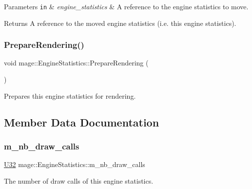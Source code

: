 \begin{DoxyParams}[1]{Parameters}
\mbox{\tt in}  & {\em engine\+\_\+statistics} & A reference to the engine statistics to move. \\
\hline
\end{DoxyParams}
\begin{DoxyReturn}{Returns}
A reference to the moved engine statistics (i.\+e. this engine statistics). 
\end{DoxyReturn}
\hypertarget{classmage_1_1_engine_statistics_a722912aa5e93caff589a52bb10be930d}{}\label{classmage_1_1_engine_statistics_a722912aa5e93caff589a52bb10be930d} 
\subsubsection{\texorpdfstring{Prepare\+Rendering()}{PrepareRendering()}}
{\footnotesize\ttfamily void mage\+::\+Engine\+Statistics\+::\+Prepare\+Rendering (\begin{DoxyParamCaption}{ }\end{DoxyParamCaption})\hspace{0.3cm}{\ttfamily [noexcept]}}

Prepares this engine statistics for rendering. 

\subsection{Member Data Documentation}
\hypertarget{classmage_1_1_engine_statistics_a26eeba872cebff2657b8b023751b1894}{}\label{classmage_1_1_engine_statistics_a26eeba872cebff2657b8b023751b1894} 
\subsubsection{\texorpdfstring{m\+\_\+nb\+\_\+draw\+\_\+calls}{m\_nb\_draw\_calls}}
{\footnotesize\ttfamily \hyperlink{namespacemage_a41c104c036fba3756a74e19f793eeaa1}{U32} mage\+::\+Engine\+Statistics\+::m\+\_\+nb\+\_\+draw\+\_\+calls\hspace{0.3cm}{\ttfamily [private]}}

The number of draw calls of this engine statistics. 